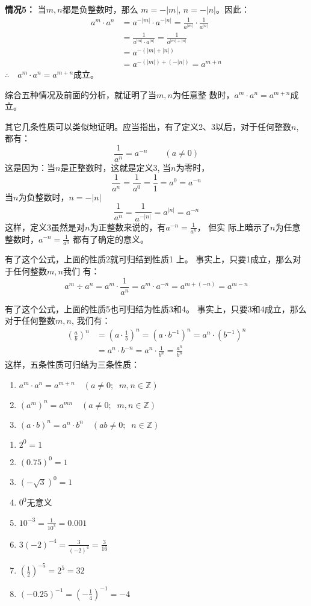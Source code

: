 \textbf{情况5：} 当$m,n$都是负整数时，那么
$m=-|m|$, $n=-|n|$。因此：
\[\begin{split}
    a^m\cdot a^n&=a^{-|m|}\cdot a^{-|n|}=\frac{1}{a^{|m|}}\cdot \frac{1}{a^{|n|}}\\
    &=\frac{1}{a^{|m|}\cdot a^{|n|}}=\frac{1}{a^{|m|+|n|}}\\
    &=a^{-(|m|+|n|)}\\
    &=a^{-(|m|)+(-|n|)}=a^{m+n}
\end{split}\]
$\therefore\quad a^m\cdot a^n=a^{m+n}$成立。

综合五种情况及前面的分析，就证明了当$m,n$为任意整
数时，$a^m\cdot a^n=a^{m+n}$成立。

其它几条性质可以类似地证明。应当指出，有了定义2、3以后，对于任何整数$n$, 都有：
\[\frac{1}{a^n}=a^{-n}\qquad (a\ne 0)\]
这是因为：当$n$是正整数时，这就是定义3, 当$n$为零时，
 \[\frac{1}{a^n}=\frac{1}{a^0}=\frac{1}{1}=a^0=a^{-n}\]
 当$n$为负整数时，$n=-|n|$
\[\frac{1}{a^n}=\frac{1}{a^{-|n|}}=a^{|n|}=a^{-n}\]
这样，定义3虽然是对$n$为正整数来说的，有$a^{-n}=\frac{1}{a^n}$，
但实
际上暗示了$n$为任意整数时，$a^{-n}=\frac{1}{a^n}$
都有了确定的意义。

有了这个公式，上面的性质2就可归结到性质1
上。
事实上，只要1成立，那么对于任何整数$m,n$我们
有：
\[a^m\div a^n=a^m\cdot \frac{1}{a^n}=a^m\cdot a^{-n}=a^{m+(-n)}=a^{m-n}\]

有了这个公式，上面的性质5也可归结为性质3和4。
事实上，只要3和4成立，那么对于任何整数$m,n$,
我们有：
\[\begin{split}
    \left(\frac{a}{b}\right)^n&=\left(a\cdot\frac{1}{b}\right)^n=(a\cdot b^{-1})^n=a^n\cdot (b^{-1})^n\\
    &=a^n \cdot b^{-n}=a^n\cdot \frac{1}{b^n}=\frac{a^n}{b^n}
\end{split}\]
这样，五条性质可归结为三条性质：
\begin{enumerate}
    \item $a^m\cdot a^n=a^{m+n}\quad (a\ne 0;\;\;m,n\in\mathbb{Z})$
    \item $(a^m)^n=a^{mn}\quad (a\ne 0;\;\;m,n\in\mathbb{Z})$
    \item $(a\cdot b)^n=a^n\cdot b^n \quad (ab\ne 0;\;\;n\in\mathbb{Z})$
\end{enumerate}


\begin{example}
\begin{multicols}{2}  
    \begin{enumerate}
        \item $2^0=1$
        \item $(0.75)^0=1$
        \item $\left(-\sqrt{3}\right)^0=1$
        \item $0^0$无意义
        \item $10^{-3}=\frac{1}{10^3}=0.001$
        \item $3(-2)^{-4}=\frac{3}{(-2)^{4}}=\frac{3}{16}$
        \item $\left(\frac{1}{2}\right)^{-5}=2^5=32$
        \item $(-0.25)^{-1}=\left(-\frac{1}{4}\right)^{-1}=-4$
    \end{enumerate}
\end{multicols}   
\end{example}

